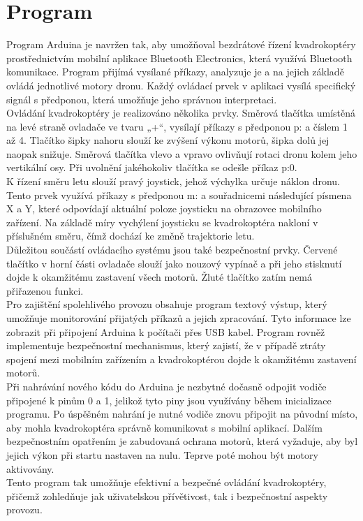 \documentclass[12pt]{report}
\begin{document}
\chapter{Program}
Program Arduina je navržen tak, aby umožňoval bezdrátové řízení kvadrokoptéry prostřednictvím mobilní aplikace Bluetooth Electronics, která využívá Bluetooth komunikace. Program přijímá vysílané příkazy, analyzuje je a na jejich základě ovládá jednotlivé motory dronu. Každý ovládací prvek v aplikaci vysílá specifický signál s předponou, která umožňuje jeho správnou interpretaci.\\
Ovládání kvadrokoptéry je realizováno několika prvky. Směrová tlačítka umístěná na levé straně ovladače ve tvaru „+“, vysílají příkazy s předponou p: a číslem 1 až 4. Tlačítko šipky nahoru slouží ke zvýšení výkonu motorů, šipka dolů jej naopak snižuje. Směrová tlačítka vlevo a vpravo ovlivňují rotaci dronu kolem jeho vertikální osy. Při uvolnění jakéhokoliv tlačítka se odešle příkaz p:0.\\
K řízení směru letu slouží pravý joystick, jehož výchylka určuje náklon dronu. Tento prvek využívá příkazy s předponou m: a souřadnicemi následující písmena X a Y, které odpovídají aktuální poloze joysticku na obrazovce mobilního zařízení. Na základě míry vychýlení joysticku se kvadrokoptéra nakloní v příslušném směru, čímž dochází ke změně trajektorie letu.\\
Důležitou součástí ovládacího systému jsou také bezpečnostní prvky. Červené tlačítko v horní části ovladače slouží jako nouzový vypínač a při jeho stisknutí dojde k okamžitému zastavení všech motorů. Žluté tlačítko zatím nemá přiřazenou funkci.\\
Pro zajištění spolehlivého provozu obsahuje program textový výstup, který umožňuje monitorování přijatých příkazů a jejich zpracování. Tyto informace lze zobrazit při připojení Arduina k počítači přes USB kabel. Program rovněž implementuje bezpečnostní mechanismus, který zajistí, že v případě ztráty spojení mezi mobilním zařízením a kvadrokoptérou dojde k okamžitému zastavení motorů.\\
Při nahrávání nového kódu do Arduina je nezbytné dočasně odpojit vodiče připojené k pinům 0 a 1, jelikož tyto piny jsou využívány během inicializace programu. Po úspěšném nahrání je nutné vodiče znovu připojit na původní místo, aby mohla kvadrokoptéra správně komunikovat s mobilní aplikací. Dalším bezpečnostním opatřením je zabudovaná ochrana motorů, která vyžaduje, aby byl jejich výkon při startu nastaven na nulu. Teprve poté mohou být motory aktivovány.\\
Tento program tak umožňuje efektivní a bezpečné ovládání kvadrokoptéry, přičemž zohledňuje jak uživatelskou přívětivost, tak i bezpečnostní aspekty provozu.
\end{document}
